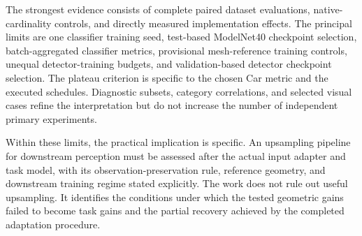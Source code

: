 The strongest evidence consists of complete paired dataset evaluations,
native-cardinality controls, and directly measured implementation effects.
The principal limits are one classifier training seed, test-based ModelNet40
checkpoint selection, batch-aggregated classifier metrics, provisional
mesh-reference training controls, unequal detector-training budgets,
and validation-based detector checkpoint selection. The plateau criterion
is specific to the chosen Car metric and the executed schedules. Diagnostic subsets, category
correlations, and selected visual cases refine the interpretation but do
not increase the number of independent primary experiments.

Within these limits, the practical implication is specific. An upsampling
pipeline for downstream perception must be assessed after the actual
input adapter and task model, with its observation-preservation rule,
reference geometry, and downstream training regime stated explicitly.
The work does not rule out useful upsampling. It identifies the conditions
under which the tested geometric gains failed to become task gains and
the partial recovery achieved by the completed adaptation procedure.
